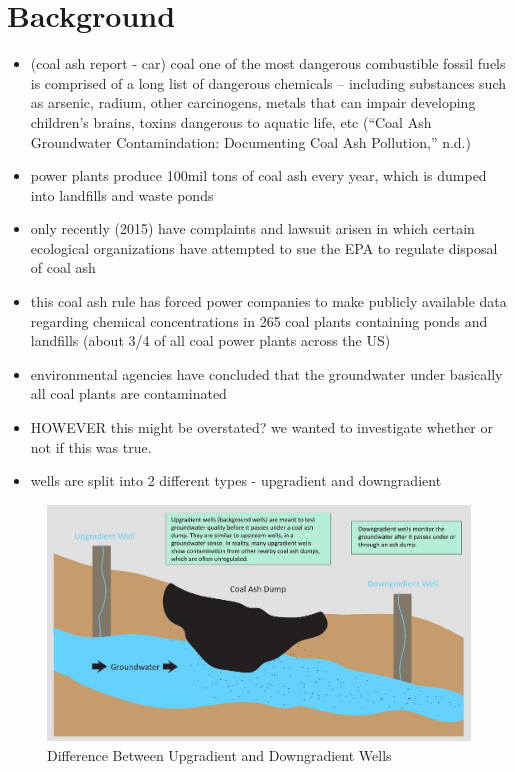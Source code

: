 \documentclass[12pt, twoside]{amherstthesis}
\begin{document}
\hypertarget{background}{%
\section{Background}\label{background}}
\begin{itemize}
\item
  (coal ash report - car) coal one of the most dangerous combustible fossil fuels is comprised of a long list of dangerous chemicals -- including substances such as arsenic, radium, other carcinogens, metals that can impair developing children's brains, toxins dangerous to aquatic life, etc (``Coal Ash Groundwater Contamindation: Documenting Coal Ash Pollution,'' n.d.)
\item
  power plants produce 100mil tons of coal ash every year, which is dumped into landfills and waste ponds
\item
  only recently (2015) have complaints and lawsuit arisen in which certain ecological organizations have attempted to sue the EPA to regulate disposal of coal ash
\item
  this coal ash rule has forced power companies to make publicly available data regarding chemical concentrations in 265 coal plants containing ponds and landfills (about 3/4 of all coal power plants across the US)
\item
  environmental agencies have concluded that the groundwater under basically all coal plants are contaminated
\item
  HOWEVER this might be overstated? we wanted to investigate whether or not if this was true.
\item
  wells are split into 2 different types - upgradient and downgradient
\end{itemize}
\begin{figure}

{\centering \includegraphics[width=1\linewidth]{figures/upgradientdowngradient} 

}

\caption{Difference Between Upgradient and Downgradient Wells}\label{fig:upgradientdowngradient}
\end{figure}
\end{document}
